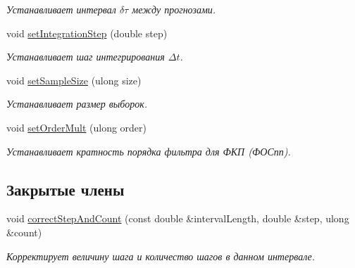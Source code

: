 \begin{DoxyCompactItemize}
\begin{DoxyCompactList}\small\item\em Устанавливает интервал $\delta \tau$ между прогнозами. \end{DoxyCompactList}\item 
void \hyperlink{class_core_1_1_filter_parameters_a8349d4d94febddd3367865b60b3deed5}{set\+Integration\+Step} (double step)\hypertarget{class_core_1_1_filter_parameters_a8349d4d94febddd3367865b60b3deed5}{}\label{class_core_1_1_filter_parameters_a8349d4d94febddd3367865b60b3deed5}

\begin{DoxyCompactList}\small\item\em Устанавливает шаг интегрирования $\Delta t$. \end{DoxyCompactList}\item 
void \hyperlink{class_core_1_1_filter_parameters_a3b7b8345d450d60f8e4fbe7bbe825fd6}{set\+Sample\+Size} (ulong size)\hypertarget{class_core_1_1_filter_parameters_a3b7b8345d450d60f8e4fbe7bbe825fd6}{}\label{class_core_1_1_filter_parameters_a3b7b8345d450d60f8e4fbe7bbe825fd6}

\begin{DoxyCompactList}\small\item\em Устанавливает размер выборок. \end{DoxyCompactList}\item 
void \hyperlink{class_core_1_1_filter_parameters_a763a74eb5ae44bfde79110a38bb79867}{set\+Order\+Mult} (ulong order)\hypertarget{class_core_1_1_filter_parameters_a763a74eb5ae44bfde79110a38bb79867}{}\label{class_core_1_1_filter_parameters_a763a74eb5ae44bfde79110a38bb79867}

\begin{DoxyCompactList}\small\item\em Устанавливает кратность порядка фильтра для ФКП (ФОСпп). \end{DoxyCompactList}\end{DoxyCompactItemize}
\subsection*{Закрытые члены}
\begin{DoxyCompactItemize}
\item 
void \hyperlink{class_core_1_1_filter_parameters_abd97b1d6389fb381e9808f15a271dfc3}{correct\+Step\+And\+Count} (const double \&interval\+Length, double \&step, ulong \&count)
\begin{DoxyCompactList}\small\item\em Корректирует величину шага и количество шагов в данном интервале. \end{DoxyCompactList}\end{DoxyCompactItemize}
